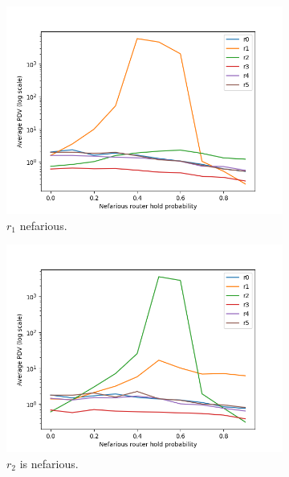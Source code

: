 \begin{figure}[H]
    \centering 
    \begin{subfigure}{0.475\textwidth}
        \includegraphics[width=\textwidth]{figs/results/1_nef.png}
        \caption[]{$r_1$ nefarious.}
    \end{subfigure}
    \begin{subfigure}{0.475\textwidth}
        \includegraphics[width=\textwidth]{figs/results/2_nef.png}
        \caption[]{$r_2$ is nefarious.}
    \end{subfigure}
    \hfill
    \centering
    \begin{subfigure}{0.475\textwidth}

\end{subfigure}
\end{figure}
